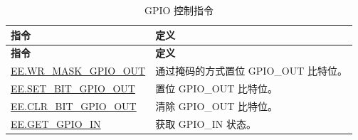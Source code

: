 \begin{longtable}[c]{|l|m{10cm}|}
    \caption{GPIO 控制指令}
    \label{tab:pie-gpio-instrucitons}\\
    \hline
    \rowcolor{lightgray}
    \textbf{指令} & \textbf{定义} \\\hline
    \endfirsthead
    \rowcolor{lightgray}
    \textbf{指令} & \textbf{定义} \\\hline
    \endhead
    \endfoot

    \hyperref[instruction:EEWRMASKGPIOOUT]{EE.WR\_MASK\_GPIO\_OUT} & 通过掩码的方式置位 GPIO\_OUT 比特位。
    \\\hline
    \hyperref[instruction:EESETBITGPIOOUT]{EE.SET\_BIT\_GPIO\_OUT} & 置位 GPIO\_OUT 比特位。
    \\\hline
    \hyperref[instruction:EECLRBITGPIOOUT]{EE.CLR\_BIT\_GPIO\_OUT} & 清除 GPIO\_OUT 比特位。
    \\\hline
    \hyperref[instruction:EEGETGPIOIN]{EE.GET\_GPIO\_IN} & 获取 GPIO\_IN 状态。
    \\\hline
\end{longtable}